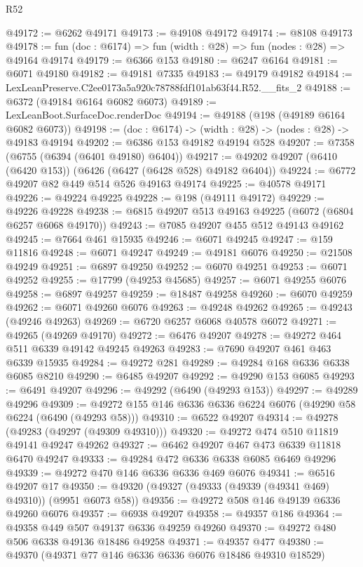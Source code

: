 \begin{lexlean}{R52}
\begin{coremodule}
@49172 := @6262 @49171
@49173 := @49108 @49172
@49174 := @8108 @49173
@49178 := fun (doc : @6174) => fun (width : @28) => fun (nodes : @28) => @49164 @49174
@49179 := @6366 @153
@49180 := @6247 @6164
@49181 := @6071 @49180
@49182 := @49181 @7335
@49183 := @49179 @49182
@49184 := LexLeanPreserve.C2ee0173a5a920c78788fdf101ab63f44.R52.__fits_2
@49188 := @6372 (@49184 @6164 @6082 @6073)
@49189 := LexLeanBoot.SurfaceDoc.renderDoc
@49194 := @49188 (@198 (@49189 @6164 @6082 @6073))
@49198 := (doc : @6174) -> (width : @28) -> (nodes : @28) -> @49183 @49194
@49202 := @6386 @153 @49182 @49194 @528
@49207 := @7358 (@6755 (@6394 (@6401 @49180) @6404))
@49217 := @49202 @49207 (@6410 (@6420 @153)) (@6426 (@6427 (@6428 @528) @49182 @6404))
@49224 := @6772 @49207 @82 @449 @514 @526 @49163 @49174
@49225 := @40578 @49171
@49226 := @49224 @49225
@49228 := @198 (@49111 @49172)
@49229 := @49226 @49228
@49238 := @6815 @49207 @513 @49163 @49225 (@6072 (@6804 @6257 @6068 @49170))
@49243 := @7085 @49207 @455 @512 @49143 @49162
@49245 := @7664 @461 @15935
@49246 := @6071 @49245
@49247 := @159 @11816
@49248 := @6071 @49247
@49249 := @49181 @6076
@49250 := @21508 @49249
@49251 := @6897 @49250
@49252 := @6070 @49251
@49253 := @6071 @49252
@49255 := @17799 (@49253 @45685)
@49257 := @6071 @49255 @6076
@49258 := @6897 @49257
@49259 := @18487 @49258
@49260 := @6070 @49259
@49262 := @6071 @49260 @6076
@49263 := @49248 @49262
@49265 := @49243 (@49246 @49263)
@49269 := @6720 @6257 @6068 @40578 @6072
@49271 := @49265 (@49269 @49170)
@49272 := @6476 @49207
@49278 := @49272 @464 @511 @6339 @49142 @49245 @49263
@49283 := @7690 @49207 @461 @463 @6339 @15935
@49284 := @49272 @281
@49289 := @49284 @168 @6336 @6338 @6085 @8210
@49290 := @6485 @49207
@49292 := @49290 @153 @6085
@49293 := @6491 @49207
@49296 := @49292 (@6490 (@49293 @153))
@49297 := @49289 @49296
@49309 := @49272 @155 @146 @6336 @6336 @6224 @6076 (@49290 @58 @6224 (@6490 (@49293 @58)))
@49310 := @6522 @49207
@49314 := @49278 (@49283 (@49297 (@49309 @49310)))
@49320 := @49272 @474 @510 @11819 @49141 @49247 @49262
@49327 := @6462 @49207 @467 @473 @6339 @11818 @6470 @49247
@49333 := @49284 @472 @6336 @6338 @6085 @6469 @49296
@49339 := @49272 @470 @146 @6336 @6336 @469 @6076
@49341 := @6516 @49207 @17
@49350 := @49320 (@49327 (@49333 (@49339 (@49341 @469) @49310)) (@9951 @6073 @58))
@49356 := @49272 @508 @146 @49139 @6336 @49260 @6076
@49357 := @6938 @49207
@49358 := @49357 @186
@49364 := @49358 @449 @507 @49137 @6336 @49259 @49260
@49370 := @49272 @480 @506 @6338 @49136 @18486 @49258
@49371 := @49357 @477
@49380 := @49370 (@49371 @77 @146 @6336 @6336 @6076 @18486 @49310 @18529)

\end{coremodule}
\end{lexlean}
